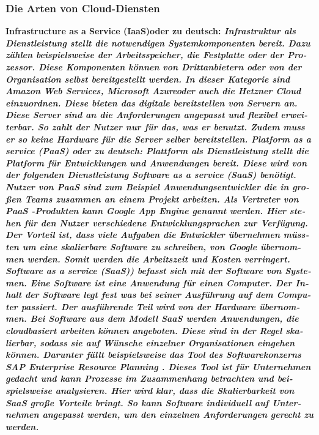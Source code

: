\begin{otherlanguage}{ngerman}
\subsubsection{Die Arten von Cloud-Diensten}
\bf Infrastructure as a Service (IaaS)\rm oder zu deutsch: \it Infrastruktur als Dienstleistung \rm stellt die notwendigen Systemkomponenten bereit. Dazu zählen beispielsweise der Arbeitsspeicher, die Festplatte oder der Prozessor. Diese Komponenten können von Drittanbietern oder von der Organisation selbst bereitgestellt werden. In dieser Kategorie sind \it Amazon Web Services\rm,  \it Microsoft Azure\rm oder auch die  \it Hetzner Cloud \rm einzuordnen. Diese bieten das digitale bereitstellen von Servern an. Diese Server sind an die Anforderungen angepasst und flexibel erweiterbar. So zahlt der Nutzer nur für das, was er benutzt. Zudem muss er so keine Hardware für die Server selber bereitstellen. 
\newline 
\bf Platform as a service (PaaS) \rm  oder zu deutsch: \it Plattform als Dienstleistung \rm stellt die Platform für Entwicklungen und Anwendungen bereit. Diese wird von der folgenden Dienstleistung \it Software as a service (SaaS) \rm benötigt. Nutzer von PaaS sind zum Beispiel Anwendungsentwickler die in großen Teams zusammen an einem Projekt arbeiten. Als Vertreter von \it PaaS \rm -Produkten kann \it Google App Engine \rm genannt werden. Hier stehen für den Nutzer verschiedene Entwicklungsprachen zur Verfügung. Der Vorteil ist, dass viele Aufgaben die Entwickler übernehmen müssten um eine skalierbare Software zu schreiben, von Google übernommen werden. Somit werden die Arbeitszeit und Kosten verringert.
\newline 
\bf Software as a service (SaaS)) \rm befasst sich mit der Software von Systemen. Eine Software ist eine Anwendung für einen Computer. Der Inhalt der Software legt fest was bei seiner Ausführung auf dem Computer passiert. Der ausführende Teil wird von der Hardware übernommen. Bei Software aus dem Modell \it SaaS \rm werden Anwendungen, die cloudbasiert arbeiten können angeboten. Diese sind in der Regel skalierbar, sodass sie auf Wünsche einzelner Organisationen eingehen können. Darunter fällt beispielsweise das Tool des Softwarekonzerns SAP \it Enterprise Resource Planning \rm. Dieses Tool ist für Unternehmen gedacht und kann Prozesse im Zusammenhang betrachten und beispielsweise analysieren. Hier wird klar, dass die Skalierbarkeit von \it SaaS \rm große Vorteile bringt. So kann Software individuell auf Unternehmen angepasst werden, um den einzelnen Anforderungen gerecht zu werden. 
\end{otherlanguage}